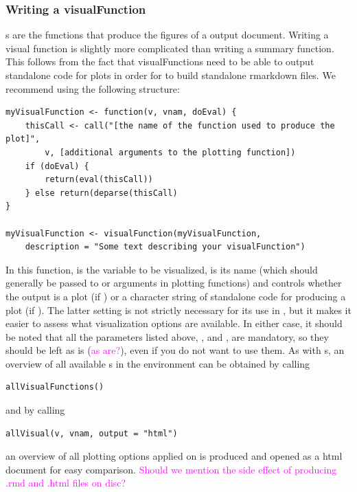 \documentclass[article]{jss}
\newcommand{\hl}[1]{\textcolor{magenta}{#1}}
\begin{document}
\subsubsection{Writing a visualFunction}
s are the functions that produce the figures of a  output document. Writing a visual function is slightly more complicated than writing a summary function. This follows from the fact that visualFunctions need to be able to output standalone code for plots in order for  to build standalone rmarkdown files. We recommend using the following structure:
\begin{Verbatim}
myVisualFunction <- function(v, vnam, doEval) {
	thisCall <- call("[the name of the function used to produce the plot]",
		v, [additional arguments to the plotting function])
	if (doEval) {
		return(eval(thisCall))
	} else return(deparse(thisCall)
}

myVisualFunction <- visualFunction(myVisualFunction,
	description = "Some text describing your visualFunction")
\end{Verbatim}
In this function,  is the variable to be visualized,  is its name (which should generally be passed to  or  arguments in plotting functions) and  controls whether the output is a plot (if ) or a character string of standalone code for producing a plot (if ). The latter  setting is not strictly necessary for its use in , but it makes it easier to assess what visualization options are available. In either case, it should be noted that all the parameters listed above, ,  and , are mandatory, so they should be left as is (\hl{as are?}), even if you do not want to use them. As with s, an overview of all available s in the environment can be obtained by calling
\begin{Verbatim}
allVisualFunctions()
\end{Verbatim}
and by calling
\begin{Verbatim}
allVisual(v, vnam, output = "html")
\end{Verbatim}
an overview of all plotting options applied on  is produced and opened as a html document for easy comparison. \hl{Should we mention the side effect of producing .rmd and .html files on disc?}
\end{document}
